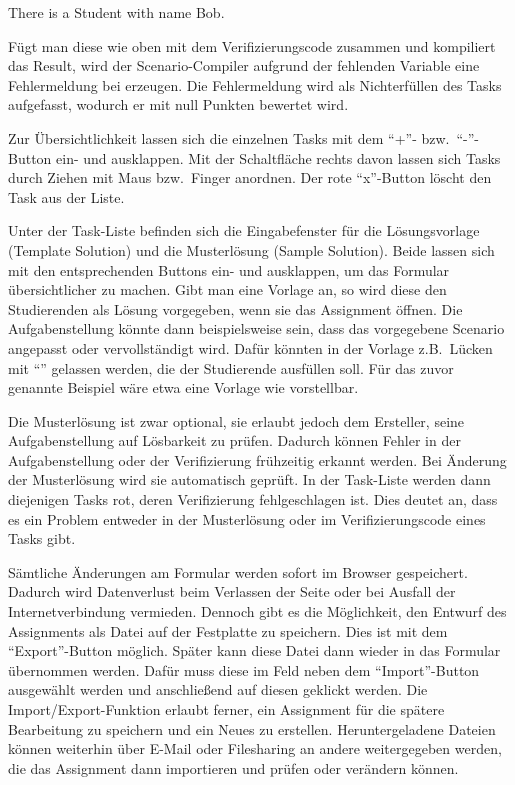 \begin{mdcodeblock}
    There is a Student with name Bob.
\end{mdcodeblock}

Fügt man diese wie oben mit dem Verifizierungscode zusammen und kompiliert das Result,
wird der Scenario-Compiler aufgrund der fehlenden Variable  eine Fehlermeldung bei  erzeugen.
Die Fehlermeldung wird als Nichterfüllen des Tasks aufgefasst,
wodurch er mit null Punkten bewertet wird.

Zur Übersichtlichkeit lassen sich die einzelnen Tasks mit dem ``+''- bzw.\ ``-''-Button ein- und ausklappen.
Mit der Schaltfläche rechts davon lassen sich Tasks durch Ziehen mit Maus bzw.\ Finger anordnen.
Der rote ``x''-Button löscht den Task aus der Liste.

Unter der Task-Liste befinden sich die Eingabefenster für die Lösungsvorlage (Template Solution) und die Musterlösung (Sample Solution).
Beide lassen sich mit den entsprechenden Buttons ein- und ausklappen, um das Formular übersichtlicher zu machen.
Gibt man eine Vorlage an, so wird diese den Studierenden als Lösung vorgegeben, wenn sie das Assignment öffnen.
Die Aufgabenstellung könnte dann beispielsweise sein, dass das vorgegebene Scenario angepasst oder vervollständigt wird.
Dafür könnten in der Vorlage z.B.\ Lücken mit ``'' gelassen werden, die der Studierende ausfüllen soll.
Für das zuvor genannte Beispiel wäre etwa eine Vorlage wie  vorstellbar.

Die Musterlösung ist zwar optional, sie erlaubt jedoch dem Ersteller, seine Aufgabenstellung auf Lösbarkeit zu prüfen.
Dadurch können Fehler in der Aufgabenstellung oder der Verifizierung frühzeitig erkannt werden.
Bei Änderung der Musterlösung wird sie automatisch geprüft.
In der Task-Liste werden dann diejenigen Tasks rot, deren Verifizierung fehlgeschlagen ist.
Dies deutet an, dass es ein Problem entweder in der Musterlösung oder im Verifizierungscode eines Tasks gibt.

Sämtliche Änderungen am Formular werden sofort im Browser gespeichert.
Dadurch wird Datenverlust beim Verlassen der Seite oder bei Ausfall der Internetverbindung vermieden.
Dennoch gibt es die Möglichkeit, den Entwurf des Assignments als Datei auf der Festplatte zu speichern.
Dies ist mit dem ``Export''-Button möglich.
Später kann diese Datei dann wieder in das Formular übernommen werden.
Dafür muss diese im Feld neben dem ``Import''-Button ausgewählt werden und anschließend auf diesen geklickt werden.
Die Import/Export-Funktion erlaubt ferner, ein Assignment für die spätere Bearbeitung zu speichern und ein Neues zu erstellen.
Heruntergeladene Dateien können weiterhin über E-Mail oder Filesharing an andere weitergegeben werden,
die das Assignment dann importieren und prüfen oder verändern können.

